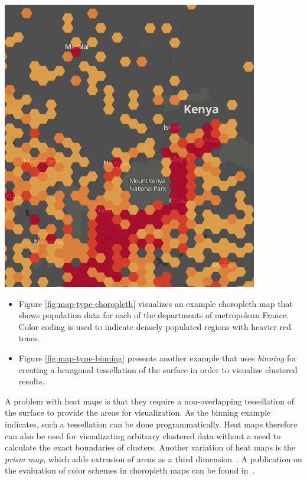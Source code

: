 \begin{itemize}
{    \includegraphics [width=\linewidth]{figures/map_types_heatmap.png}
    \label{fig:map-type-binning}
}


\begin{itemize}

\item Figure \ref{fig:map-type-choropleth} visualizes an example choropleth map that shows population data for each of the departments of metropolean France. Color coding is used to indicate densely populated regions with heavier red tones.

\item Figure \ref{fig:map-type-binning} presents another example that uses \textit{binning} for creating a hexagonal tessellation of the surface in order to visualize clustered results. 

\end {itemize}

A problem with heat maps is that they require a non-overlapping tessellation of the surface to provide the areas for visualization. As the binning example indicates, such a tessellation can be done programmatically. Heat maps therefore can also be used for visualizating arbitrary clustered data without a need to calculate the exact boundaries of clusters. Another variation of heat maps is the \textit{prism map}, which adds extrusion of areas as a third dimension~\cite{ladenhauf12dia, Delort10vis}. A publication on the evaluation of color schemes in choropleth maps can be found in~\cite{MacEachrenMort}. 



\end{itemize}
